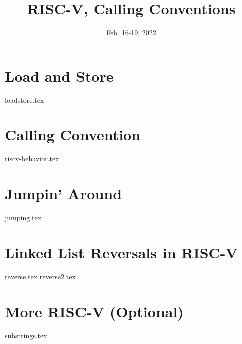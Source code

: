 \documentclass[11pt]{exam}
\title{RISC-V, Calling Conventions}
\date{Feb. 16-19, 2022}
\begin{document}
\maketitle

\section{Load and Store}
\begin{questions}
{loadstore.tex}
\end{questions}
\newpage

\section{Calling Convention}
\begin{questions}
{riscv-behavior.tex}
\end{questions}
\newpage


\section{Jumpin' Around}
\begin{questions}
{jumping.tex}
\end{questions}
\newpage

\section{Linked List Reversals in RISC-V}
\begin{questions}
{reverse.tex}
{reverse2.tex}
\end{questions}
\newpage

\section{More RISC-V (Optional)}
\begin{questions}
{substrings.tex}
\end{questions}




\end{document}
